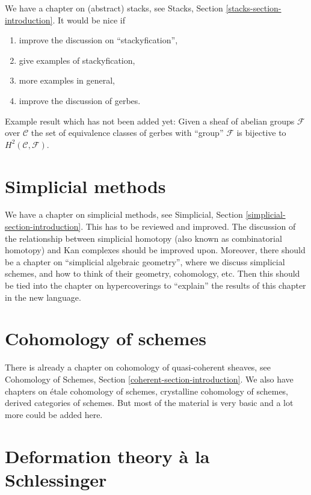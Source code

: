 \noindent
We have a chapter on (abstract) stacks, see
Stacks, Section \ref{stacks-section-introduction}.
It would be nice if
\begin{enumerate}
\item improve the discussion on ``stackyfication'',
\item give examples of stackyfication,
\item more examples in general,
\item improve the discussion of gerbes.
\end{enumerate}

\medskip\noindent
Example result which has not been added yet: Given a sheaf of abelian
groups $\mathcal{F}$
over $\mathcal{C}$ the set of equivalence classes of gerbes with ``group''
$\mathcal{F}$ is bijective to $H^2(\mathcal{C}, \mathcal{F})$.


\section{Simplicial methods}
\label{section-simplicial}

\noindent
We have a chapter on simplicial methods, see
Simplicial, Section \ref{simplicial-section-introduction}.
This has to be reviewed and improved. The discussion of
the relationship between simplicial homotopy (also known as
combinatorial homotopy) and Kan complexes should be improved upon.
Moreover, there should be a
chapter on ``simplicial algebraic geometry'', where we discuss
simplicial schemes, and how to think of their geometry, cohomology,
etc. Then this should be tied into the chapter on hypercoverings
to ``explain'' the results of this chapter in the new language.


\section{Cohomology of schemes}
\label{section-schemes-cohomology}

\noindent
There is already a chapter on cohomology of quasi-coherent sheaves, see
Cohomology of Schemes, Section \ref{coherent-section-introduction}.
We also have chapters on \'etale cohomology of schemes,
crystalline cohomology of schemes, derived categories of schemes.
But most of the material is very basic and a lot more could be added here.


\section{Deformation theory \`a la Schlessinger}
\label{section-deformation-schlessinger}

